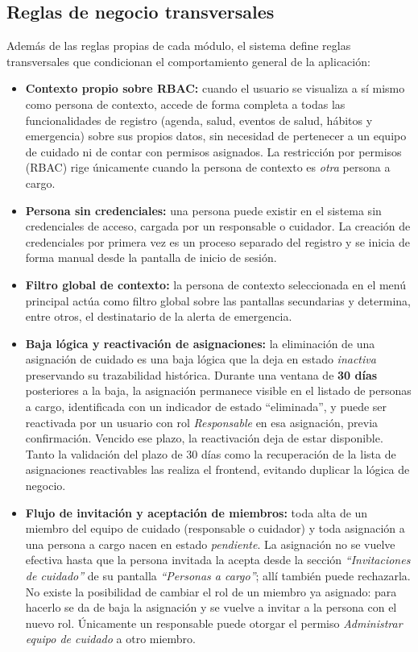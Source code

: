 \documentclass[a4paper,12pt]{article}
\begin{document}
    \subsection{Reglas de negocio transversales}
    \par Además de las reglas propias de cada módulo, el sistema define reglas transversales que condicionan el comportamiento general de la aplicación:
    \begin{itemize}
        \item \textbf{Contexto propio sobre RBAC:} cuando el usuario se visualiza a sí mismo como persona de contexto, accede de forma completa a todas las funcionalidades de registro (agenda, salud, eventos de salud, hábitos y emergencia) sobre sus propios datos, sin necesidad de pertenecer a un equipo de cuidado ni de contar con permisos asignados. La restricción por permisos (RBAC) rige únicamente cuando la persona de contexto es \textit{otra} persona a cargo.
        \item \textbf{Persona sin credenciales:} una persona puede existir en el sistema sin credenciales de acceso, cargada por un responsable o cuidador. La creación de credenciales por primera vez es un proceso separado del registro y se inicia de forma manual desde la pantalla de inicio de sesión.
        \item \textbf{Filtro global de contexto:} la persona de contexto seleccionada en el menú principal actúa como filtro global sobre las pantallas secundarias y determina, entre otros, el destinatario de la alerta de emergencia.
        \item \textbf{Baja lógica y reactivación de asignaciones:} la eliminación de una asignación de cuidado es una baja lógica que la deja en estado \textit{inactiva} preservando su trazabilidad histórica. Durante una ventana de \textbf{30 días} posteriores a la baja, la asignación permanece visible en el listado de personas a cargo, identificada con un indicador de estado “eliminada”, y puede ser reactivada por un usuario con rol \textit{Responsable} en esa asignación, previa confirmación. Vencido ese plazo, la reactivación deja de estar disponible. Tanto la validación del plazo de 30 días como la recuperación de la lista de asignaciones reactivables las realiza el frontend, evitando duplicar la lógica de negocio.
        \item \textbf{Flujo de invitación y aceptación de miembros:} toda alta de un miembro del equipo de cuidado (responsable o cuidador) y toda asignación a una persona a cargo nacen en estado \textit{pendiente}. La asignación no se vuelve efectiva hasta que la persona invitada la acepta desde la sección \textit{``Invitaciones de cuidado''} de su pantalla \textit{``Personas a cargo''}; allí también puede rechazarla. No existe la posibilidad de cambiar el rol de un miembro ya asignado: para hacerlo se da de baja la asignación y se vuelve a invitar a la persona con el nuevo rol. Únicamente un responsable puede otorgar el permiso \textit{Administrar equipo de cuidado} a otro miembro.
    \end{itemize}
\end{document}
